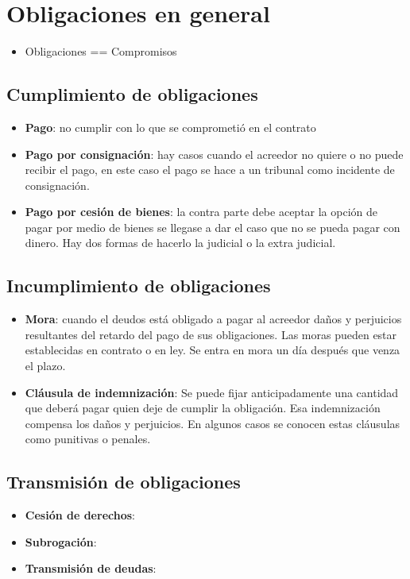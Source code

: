 \documentclass{article}
\begin{document}
\section{Obligaciones en general}
\begin{itemize}
    \item Obligaciones == Compromisos   
\end{itemize}

\subsection{Cumplimiento de obligaciones}
\begin{itemize}
    \item \textbf{Pago}: no cumplir con lo que se comprometió en el contrato
    \item \textbf{Pago por consignación}: hay casos cuando el acreedor no quiere o no puede recibir el pago, en este caso el pago se hace a un tribunal como incidente de consignación. 
    \item \textbf{Pago por cesión de bienes}: la contra parte debe aceptar la opción de pagar por medio de bienes se llegase a dar el caso que no se pueda pagar con dinero. Hay dos formas de hacerlo la judicial o la extra judicial.
\end{itemize}

\subsection{Incumplimiento de obligaciones}
\begin{itemize}
    \item \textbf{Mora}: cuando el deudos está obligado a pagar al acreedor daños y perjuicios resultantes del retardo del pago de sus obligaciones. Las moras pueden estar establecidas en contrato o en ley. Se entra en mora un día después que venza el plazo.
    \item \textbf{Cláusula de indemnización}: Se puede fijar anticipadamente una cantidad que deberá pagar quien deje de cumplir la obligación. Esa indemnización compensa los daños y perjuicios. En algunos casos se conocen estas cláusulas como punitivas o penales.
\end{itemize}

\subsection{Transmisión de obligaciones}
\begin{itemize}
    \item \textbf{Cesión de derechos}: 
    \item \textbf{Subrogación}: 
    \item \textbf{Transmisión de deudas}: 
\end{itemize}
\end{document}
